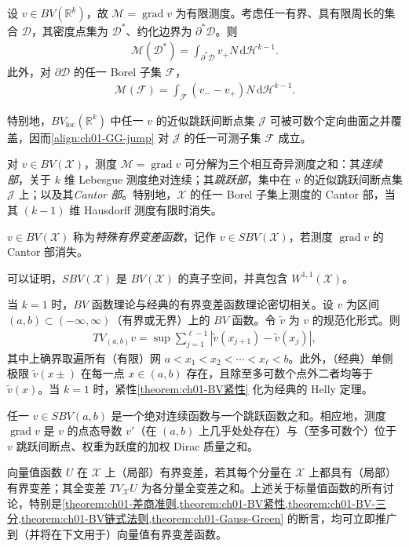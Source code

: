 \documentclass[../../main.tex]{subfiles}
\begin{document}
\begin{theorem}\label{theorem:ch01-Gauss-Green}
设 $v\in BV(\mathbb{R}^{k})$，故 $\mathscr{M}=\operatorname{grad}v$ 为有限测度。考虑任一有界、具有限周长的集合 $\mathscr{D}$，其密度点集为 $\mathscr{D}^{*}$、约化边界为 $\partial^{*}\mathscr{D}$。则
\begin{align}
\mathscr{M}(\mathscr{D}^{*})=\int_{\partial^{*}\mathscr{D}}v_{+}N\,\mathrm{d}\mathscr{H}^{k-1}.\label{align:ch01-GG-interior}
\end{align}
此外，对 $\partial\mathscr{D}$ 的任一 Borel 子集 $\mathscr{F}$，
\begin{align}
\mathscr{M}(\mathscr{F})=\int_{\mathscr{F}}(v_{-}-v_{+})N\,\mathrm{d}\mathscr{H}^{k-1}.\label{align:ch01-GG-jump}
\end{align}
\end{theorem}

特别地，$BV_{\mathrm{loc}}(\mathbb{R}^{k})$ 中任一 $v$ 的近似跳跃间断点集 $\mathscr{J}$ 可被可数个定向曲面之并覆盖，因而\cref{align:ch01-GG-jump} 对 $\mathscr{J}$ 的任一可测子集 $\mathscr{F}$ 成立。

对 $v\in BV(\mathscr{X})$，测度 $\mathscr{M}=\operatorname{grad}v$ 可分解为三个相互奇异测度之和：其\emph{连续部}，关于 $k$ 维 Lebesgue 测度绝对连续；其\emph{跳跃部}，集中在 $v$ 的近似跳跃间断点集 $\mathscr{J}$ 上；以及其\emph{Cantor 部}。特别地，$\mathscr{X}$ 的任一 Borel 子集上测度的 Cantor 部，当其 $(k-1)$ 维 Hausdorff 测度有限时消失。

\begin{definition}\label{definition:ch01-SBV}
$v\in BV(\mathscr{X})$ 称为\emph{特殊有界变差函数}，记作 $v\in SBV(\mathscr{X})$，若测度 $\operatorname{grad}v$ 的 Cantor 部消失。
\end{definition}

可以证明，$SBV(\mathscr{X})$ 是 $BV(\mathscr{X})$ 的真子空间，并真包含 $W^{1,1}(\mathscr{X})$。

当 $k=1$ 时，$BV$ 函数理论与经典的有界变差函数理论密切相关。设 $v$ 为区间 $(a,b)\subset(-\infty,\infty)$（有界或无界）上的 $BV$ 函数。令 $\tilde{v}$ 为 $v$ 的规范化形式。则
\begin{align}
TV_{(a,b)}v=\sup\sum_{j=1}^{\ell-1}|\tilde{v}(x_{j+1})-\tilde{v}(x_{j})|,\label{align:ch01-TV-1d}
\end{align}
其中上确界取遍所有（有限）网 $a<x_{1}<x_{2}<\cdots<x_{\ell}<b$。此外，（经典）单侧极限 $\tilde{v}(x\pm)$ 在每一点 $x\in(a,b)$ 存在，且除至多可数个点外二者均等于 $\tilde{v}(x)$。当 $k=1$ 时，紧性\cref{theorem:ch01-BV紧性} 化为经典的 Helly 定理。

任一 $v\in SBV(a,b)$ 是一个绝对连续函数与一个跳跃函数之和。相应地，测度 $\operatorname{grad}v$ 是 $v$ 的点态导数 $v'$（在 $(a,b)$ 上几乎处处存在）与（至多可数个）位于 $v$ 跳跃间断点、权重为跃度的加权 Dirac 质量之和。

向量值函数 $U$ 在 $\mathscr{X}$ 上（局部）有界变差，若其每个分量在 $\mathscr{X}$ 上都具有（局部）有界变差；其全变差 $TV_{\mathscr{X}}U$ 为各分量全变差之和。上述关于标量值函数的所有讨论，特别是\cref{theorem:ch01-差商准则,theorem:ch01-BV紧性,theorem:ch01-BV-三分,theorem:ch01-BV链式法则,theorem:ch01-Gauss-Green} 的断言，均可立即推广到（并将在下文用于）向量值有界变差函数。
\end{document}
